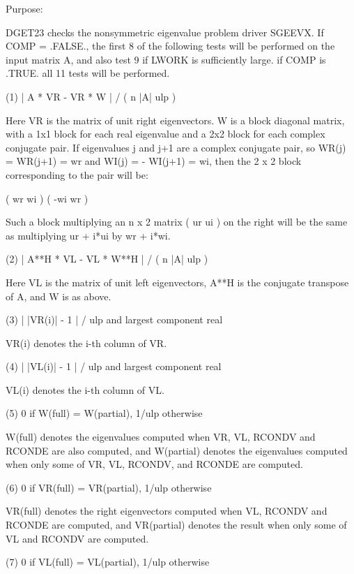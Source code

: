 \begin{DoxyParagraph}{Purpose\+: }
\begin{DoxyVerb}    DGET23  checks the nonsymmetric eigenvalue problem driver SGEEVX.
    If COMP = .FALSE., the first 8 of the following tests will be
    performed on the input matrix A, and also test 9 if LWORK is
    sufficiently large.
    if COMP is .TRUE. all 11 tests will be performed.

    (1)     | A * VR - VR * W | / ( n |A| ulp )

      Here VR is the matrix of unit right eigenvectors.
      W is a block diagonal matrix, with a 1x1 block for each
      real eigenvalue and a 2x2 block for each complex conjugate
      pair.  If eigenvalues j and j+1 are a complex conjugate pair,
      so WR(j) = WR(j+1) = wr and WI(j) = - WI(j+1) = wi, then the
      2 x 2 block corresponding to the pair will be:

              (  wr  wi  )
              ( -wi  wr  )

      Such a block multiplying an n x 2 matrix  ( ur ui ) on the
      right will be the same as multiplying  ur + i*ui  by  wr + i*wi.

    (2)     | A**H * VL - VL * W**H | / ( n |A| ulp )

      Here VL is the matrix of unit left eigenvectors, A**H is the
      conjugate transpose of A, and W is as above.

    (3)     | |VR(i)| - 1 | / ulp and largest component real

      VR(i) denotes the i-th column of VR.

    (4)     | |VL(i)| - 1 | / ulp and largest component real

      VL(i) denotes the i-th column of VL.

    (5)     0 if W(full) = W(partial), 1/ulp otherwise

      W(full) denotes the eigenvalues computed when VR, VL, RCONDV
      and RCONDE are also computed, and W(partial) denotes the
      eigenvalues computed when only some of VR, VL, RCONDV, and
      RCONDE are computed.

    (6)     0 if VR(full) = VR(partial), 1/ulp otherwise

      VR(full) denotes the right eigenvectors computed when VL, RCONDV
      and RCONDE are computed, and VR(partial) denotes the result
      when only some of VL and RCONDV are computed.

    (7)     0 if VL(full) = VL(partial), 1/ulp otherwise


\end{DoxyVerb}
\end{DoxyParagraph}
